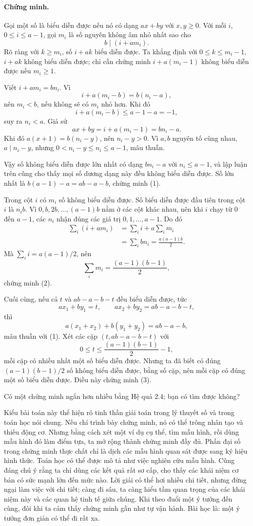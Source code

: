 \documentclass[11pt]{article}
\begin{document}
\paragraph{Chứng minh.}
Gọi một số là biểu diễn được nếu nó có dạng \(ax+by\) với \(x,y\ge0\). Với
mỗi \(i\), \(0\le i\le a-1\), gọi \(m_i\) là số nguyên không âm nhỏ nhất sao
cho
\[
 b\mid(i+am_i).
\]
Rõ ràng với \(k\ge m_i\), số \(i+ak\) biểu diễn được. Ta khẳng định với
\(0\le k\le m_i-1\), \(i+ak\) không biểu diễn được; chỉ cần chứng minh
\(i+a(m_i-1)\) không biểu diễn được nếu \(m_i\ge1\).

Viết \(i+am_i=bn_i\). Vì
\[
 i+a(m_i-b)=b(n_i-a),
\]
nên \(m_i<b\), nếu không sẽ có \(m_i\) nhỏ hơn. Khi đó
\[
 i+a(m_i-b)\le a-1-a=-1,
\]
suy ra \(n_i<a\). Giả sử
\[
 ax+by=i+a(m_i-1)=bn_i-a.
\]
Khi đó \(a(x+1)=b(n_i-y)\), nên \(n_i-y>0\). Vì \(a,b\) nguyên tố cùng nhau,
\(a\mid n_i-y\), nhưng \(0<n_i-y\le n_i\le a-1\), mâu thuẫn.

Vậy số không biểu diễn được lớn nhất có dạng \(bn_i-a\) với \(n_i\le a-1\),
và lập luận trên cũng cho thấy mọi số dương dạng này đều không biểu diễn
được. Số lớn nhất là \(b(a-1)-a=ab-a-b\), chứng minh (1).

Trong cột \(i\) có \(m_i\) số không biểu diễn được. Số biểu diễn được đầu tiên
trong cột \(i\) là \(n_ib\). Vì \(0,b,2b,\ldots,(a-1)b\) nằm ở các cột khác
nhau, nên khi \(i\) chạy từ \(0\) đến \(a-1\), các \(n_i\) nhận đúng các giá
trị \(0,1,\ldots,a-1\). Do đó
\[
\begin{aligned}
\sum_i(i+am_i)
&=\sum_i i+a\sum_i m_i\\
&=\sum_i bn_i=\frac{a(a-1)b}{2}.
\end{aligned}
\]
Mà \(\sum_i i=a(a-1)/2\), nên
\[
 \sum_i m_i=\frac{(a-1)(b-1)}2,
\]
chứng minh (2).

Cuối cùng, nếu cả \(t\) và \(ab-a-b-t\) đều biểu diễn được, tức
\[
 ax_1+by_1=t,\qquad ax_2+by_2=ab-a-b-t,
\]
thì
\[
 a(x_1+x_2)+b(y_1+y_2)=ab-a-b,
\]
mâu thuẫn với (1). Xét các cặp \((t,ab-a-b-t)\) với
\[
 0\le t\le\frac{(a-1)(b-1)}2-1,
\]
mỗi cặp có nhiều nhất một số biểu diễn được. Nhưng ta đã biết có đúng
\((a-1)(b-1)/2\) số không biểu diễn được, bằng số cặp, nên mỗi cặp có đúng một
số biểu diễn được. Điều này chứng minh (3).

Có một chứng minh ngắn hơn nhiều bằng Hệ quả 2.4; bạn có tìm được không?

Kiểu bài toán này thể hiện rõ tinh thần giải toán trong lý thuyết số và trong
toán học nói chung. Nếu chỉ trình bày chứng minh, nó có thể trông nhân tạo và
thiếu động cơ. Nhưng bằng cách xét một ví dụ cụ thể, tìm mẫu hình, rồi dùng
mẫu hình đó làm điểm tựa, ta mở rộng thành chứng minh đầy đủ. Phần đại số
trong chứng minh thực chất chỉ là dịch các mẫu hình quan sát được sang ký hiệu
hình thức. Toán học có thể được mô tả như việc nghiên cứu mẫu hình. Cũng đáng
chú ý rằng ta chỉ dùng các kết quả rất sơ cấp, cho thấy các khái niệm cơ bản
có sức mạnh lớn đến mức nào. Lời giải có thể hơi nhiều chi tiết, nhưng đừng
ngại làm việc với chi tiết; càng đi sâu, ta càng hiểu tầm quan trọng của các
khái niệm này và các quan hệ tinh tế giữa chúng. Khi theo đuổi một ý tưởng
đến cùng, đôi khi ta cảm thấy chứng minh gần như tự vận hành. Bài học là: một
ý tưởng đơn giản có thể đi rất xa.
\end{document}
